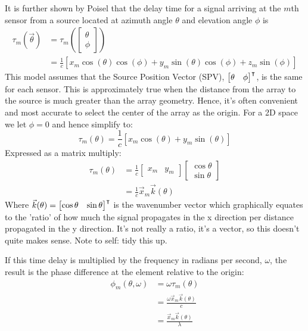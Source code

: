 It is further shown by Poisel that the delay time for a signal arriving at the \(m\)th sensor from a source located at azimuth angle \(\theta\) and elevation angle \(\phi\) is
\begin{align}
 \tau_m(\vec{\theta}) &= \tau_m ( \begin{bmatrix} \theta \\ \phi \end{bmatrix} ) \\
                       &= \frac{1}{c} [ x_m\cos(\theta)\cos(\phi) + y_m\sin(\theta)\cos(\phi) + z_m\sin(\phi) ]
\end{align}
This model assumes that the Source Position Vector (SPV), \(\begin{bmatrix}\theta & \phi\end{bmatrix}^\intercal\), is the same for each sensor. This is approximately true when the distance from the array to the source is much greater than the array geometry. Hence, it's often convenient and most accurate to select the center of the array as the origin. 
For a 2D space we let \(\phi = 0\) and hence simplify to:
\begin{equation}
 \tau_m(\theta) = \frac{1}{c} [ x_m\cos(\theta) + y_m\sin(\theta) ]
\end{equation}
Expressed as a matrix multiply:
\begin{align}
\tau_m(\theta) &= \frac{1}{c}\begin{bmatrix}x_m & y_m\end{bmatrix}\begin{bmatrix}\cos\theta\\ \sin\theta\end{bmatrix} \\
          &= \frac{1}{c} \vec{x}_m \vec{k}(\theta)
\end{align}
Where \(\vec{k}(\theta) = \begin{bmatrix}\cos\theta& \sin\theta\end{bmatrix}^\intercal\) is the wavenumber vector which graphically equates to the 'ratio' of how much the signal propagates in the x direction per distance propagated in the y direction. It's not really a ratio, it's a vector, so this doesn't quite makes sense. Note to self: tidy this up.

If this time delay is multiplied by the frequency in radians per second, \(\omega\), the result is the phase difference at the element relative to the origin:
\begin{align}
  \phi_m(\theta, \omega) &= \omega\tau_m(\theta) \\
                         &= \frac{\omega \vec{x}_m \vec{k}(\theta)}{c} \\
                         &= \frac{ \vec{x}_m \vec{k}(\theta) }{\lambda}
\end{align}

